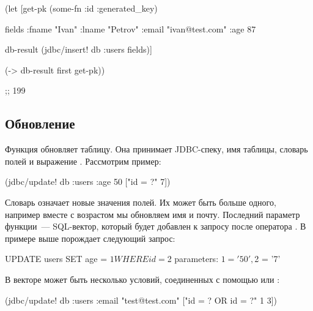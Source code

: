 \begin{english}
  \begin{clojure}
(let [get-pk
      (some-fn :id :generated_key)

      fields
      {:fname "Ivan"
       :lname "Petrov"
       :email "ivan@test.com"
       :age 87}

      db-result
      (jdbc/insert! db :users fields)]

  (-> db-result first get-pk))

;; 199
  \end{clojure}
\end{english}

\subsection{Обновление}


Функция  обновляет таблицу. Она принимает JDBC-спеку, имя таблицы, словарь полей и выражение . Рассмотрим пример:

\begin{english}
  \begin{clojure}
(jdbc/update! db :users {:age 50} ["id = ?" 7])
  \end{clojure}
\end{english}

Словарь  означает новые значения полей. Их может быть больше одного, например вместе с возрастом мы обновляем имя и почту. Последний параметр функции~--- SQL-вектор, который будет добавлен к запросу после оператора . В примере выше  порождает следующий запрос:

\begin{english}
  \begin{sql}
UPDATE users SET age = $1 WHERE id = $2
parameters: $1 = '50', $2 = '7'
  \end{sql}
\end{english}

В векторе может быть несколько условий, соединенных с помощью  или :


\begin{english}
  \begin{clojure}
(jdbc/update! db :users
              {:email "test@test.com"}
              ["id = ? OR id = ?" 1 3])
  \end{clojure}
\end{english}

